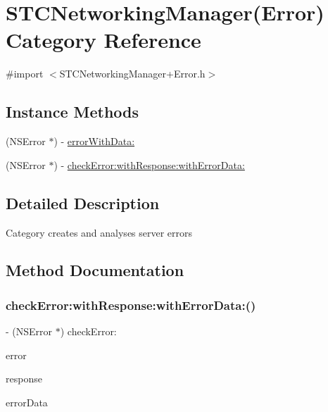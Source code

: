 \hypertarget{category_s_t_c_networking_manager_07_error_08}{}\section{S\+T\+C\+Networking\+Manager(Error) Category Reference}
\label{category_s_t_c_networking_manager_07_error_08}


{\ttfamily \#import $<$S\+T\+C\+Networking\+Manager+\+Error.\+h$>$}

\subsection*{Instance Methods}
\begin{DoxyCompactItemize}
\item 
(N\+S\+Error $\ast$) -\/ \hyperlink{category_s_t_c_networking_manager_07_error_08_a53cd7cc498ad57ef65bbde70d7ed73b3}{error\+With\+Data\+:}
\item 
(N\+S\+Error $\ast$) -\/ \hyperlink{category_s_t_c_networking_manager_07_error_08_aaabcac801d72fb8859284404965ec580}{check\+Error\+:with\+Response\+:with\+Error\+Data\+:}
\end{DoxyCompactItemize}


\subsection{Detailed Description}
Category creates and analyses server errors 

\subsection{Method Documentation}
\hypertarget{category_s_t_c_networking_manager_07_error_08_aaabcac801d72fb8859284404965ec580}{}\label{category_s_t_c_networking_manager_07_error_08_aaabcac801d72fb8859284404965ec580} 
\subsubsection{\texorpdfstring{check\+Error\+:with\+Response\+:with\+Error\+Data\+:()}{checkError:withResponse:withErrorData:()}}
{\footnotesize\ttfamily -\/ (N\+S\+Error $\ast$) check\+Error\+: \begin{DoxyParamCaption}\item[{(N\+S\+Error $\ast$)}]{error }\item[{withResponse:(N\+S\+U\+R\+L\+Response $\ast$)}]{response }\item[{withErrorData:(N\+S\+Data $\ast$)}]{error\+Data }\end{DoxyParamCaption}}

